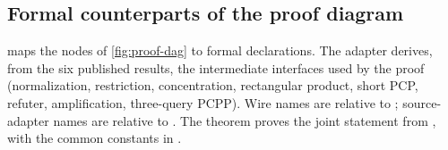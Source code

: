 
\subsection{Formal counterparts of the proof diagram}\label{app:lean-map}
 maps the nodes of \cref{fig:proof-dag} to
formal declarations. The adapter  derives, from the six published results, the intermediate interfaces used by the proof (normalization, restriction, concentration, rectangular product, short PCP, refuter, amplification, three-query PCPP). Wire names are relative to
; source-adapter names are relative to
. The theorem 
proves the joint statement from , with
the common constants in .

